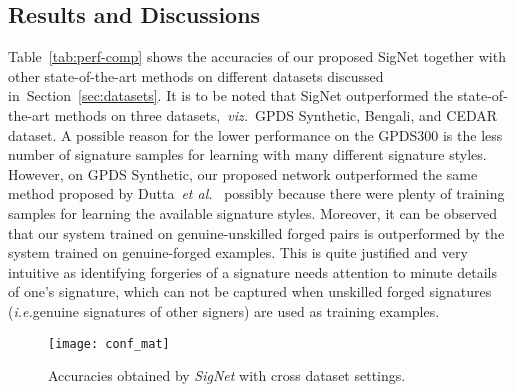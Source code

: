 \documentclass[times,twocolumn,final]{elsarticle}
\newcommand{\etal}{\textit{et al.}}
\newcommand{\ie}{\textit{i.e.}}
\newcommand{\viz}{\textit{viz.}}
\newcommand{\sect}[1]{Section~\ref{#1}}
\newcommand{\tab}[1]{Table~\ref{#1}}
\begin{document}
\subsection{Results and Discussions}
\label{sec:disc}
\tab{tab:perf-comp} shows the accuracies of our proposed SigNet together with other state-of-the-art methods on different datasets discussed in~\sect{sec:datasets}. It is to be noted that SigNet outperformed the state-of-the-art methods on three datasets,~\viz~GPDS Synthetic, Bengali, and CEDAR dataset. A possible reason for the lower performance on the GPDS300 is the less number of signature samples for learning with many different signature styles. However, on GPDS Synthetic, our proposed network outperformed the same method proposed by Dutta~\etal~\cite{Dutta2016} possibly because there were plenty of training samples for learning the available signature styles. Moreover, it can be observed that our system trained on genuine-unskilled forged pairs is outperformed by the system trained on genuine-forged examples. This is quite justified and very intuitive as identifying forgeries of a signature needs attention to minute details of one's signature, which can not be captured when unskilled forged signatures (\ie genuine signatures of other signers) are used as training examples.

\begin{figure}[htb]
\centering
\texttt{[image: conf\_mat]}
\caption{Accuracies obtained by \emph{SigNet} with cross dataset settings.}
\label{fig:acc_cross_data}
\end{figure}
\end{document}
